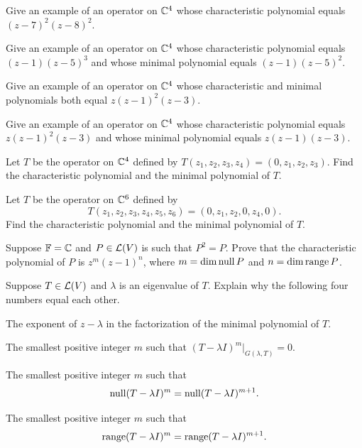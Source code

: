 \begin{exercise}
Give an example of an operator on $\mathbb{C}^4$ whose characteristic polynomial equals
$(z-7)^2(z-8)^2$.
\end{exercise}

\begin{exercise}
Give an example of an operator on $\mathbb{C}^4$ whose characteristic polynomial equals
$(z-1)(z-5)^3$ and whose minimal polynomial equals $(z-1)(z-5)^2$.
\end{exercise}

\begin{exercise}
Give an example of an operator on $\mathbb{C}^4$ whose characteristic and minimal
polynomials both equal $z(z-1)^2(z-3)$.
\end{exercise}

\begin{exercise}
Give an example of an operator on $\mathbb{C}^4$ whose characteristic polynomial equals
$z(z-1)^2(z-3)$ and whose minimal polynomial equals $z(z-1)(z-3)$.
\end{exercise}

\begin{exercise}
Let $T$ be the operator on $\mathbb{C}^4$ defined by
$T(z_1,z_2,z_3,z_4)=(0,z_1,z_2,z_3)$. Find the characteristic polynomial and
the minimal polynomial of $T$.
\end{exercise}

\begin{exercise}
Let $T$ be the operator on $\mathbb{C}^6$ defined by
\[ T(z_1,z_2,z_3,z_4,z_5,z_6) = (0,z_1,z_2,0,z_4,0). \]
Find the characteristic polynomial and the minimal polynomial of $T$.
\end{exercise}

\begin{exercise}
Suppose $\mathbb{F}=\mathbb{C}$ and $P\in\mathcal{L}(V)$ is such that $P^2=P$. Prove that the
characteristic polynomial of $P$ is $z^m(z-1)^n$, where $m=\operatorname{dim}\operatorname{null} P$ and
$n=\operatorname{dim}\operatorname{range} P$.
\end{exercise}

\begin{exercise}
Suppose $T\in\mathcal{L}(V)$ and $\lambda$ is an eigenvalue of $T$. Explain why the
following four numbers equal each other.
\begin{parts}
\item The exponent of $z-\lambda$ in the factorization of the minimal
  polynomial of $T$.
\item The smallest positive integer $m$ such that
  $(T-\lambda I)^m|_{G(\lambda,T)}=0$.
\item The smallest positive integer $m$ such that
  \[ \operatorname{null}(T-\lambda I)^m = \operatorname{null}(T-\lambda I)^{m+1}. \]
\item The smallest positive integer $m$ such that
  \[ \operatorname{range}(T-\lambda I)^m = \operatorname{range}(T-\lambda I)^{m+1}. \]
\end{parts}
\end{exercise}

